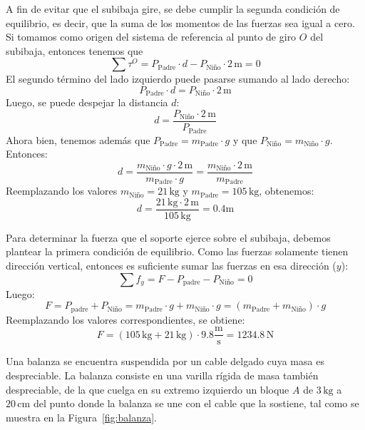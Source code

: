 \documentclass[addpoints]{exam}
\begin{document}
\begin{questions}
    \begin{solution}
    A fin de evitar que el subibaja gire, se debe cumplir la segunda condición de equilibrio, es decir, que la suma de los momentos de las fuerzas sea igual a cero. Si tomamos como origen del sistema de referencia al punto de giro \( O \) del subibaja, entonces tenemos que $$ \sum \tau^{O} = P_\text{Padre} \cdot d - P_\text{Niño} \cdot 2 \, \text{m} = 0 $$ El segundo término del lado izquierdo puede pasarse sumando al lado derecho: $$ P_\text{Padre} \cdot d = P_\text{Niño} \cdot 2 \, \text{m} $$ Luego, se puede despejar la distancia \( d \): $$ d = \frac{P_\text{Niño} \cdot 2 \, \text{m}}{P_\text{Padre}}$$ Ahora bien, tenemos además que \( P_\text{Padre} = m_\text{Padre} \cdot g \) y que \( P_\text{Niño} = m_\text{Niño} \cdot g \). Entonces: $$d = \frac{m_\text{Niño} \cdot g \cdot 2 \, \text{m}}{m_\text{Padre} \cdot g} = \frac{m_\text{Niño} \cdot 2 \, \text{m}}{m_\text{Padre}} $$ Reemplazando los valores \( m_\text{Niño} = 21 \, \text{kg} \) y \( m_\text{Padre} = 105 \, \text{kg} \), obtenemos: $$d = \frac{21 \, \text{kg} \cdot 2 \, \text{m}}{105 \, \text{kg}} = 0.4 \text{m} $$

    Para determinar la fuerza que el soporte ejerce sobre el subibaja, debemos plantear la primera condición de equilibrio. Como las fuerzas solamente tienen dirección vertical, entonces es suficiente sumar las fuerzas en esa dirección (\( y \)): $$ \sum f_y = F - P_\text{padre} - P_\text{Niño} = 0$$ Luego: $$F = P_\text{padre} + P_\text{Niño} = m_\text{Padre} \cdot g + m_\text{Niño} \cdot g  = \left(m_\text{Padre} + m_\text{Niño}\right) \cdot g $$ Reemplazando los valores correspondientes, se obtiene: $$F = \left( 105 \, \text{kg} + 21 \, \text{kg}\right) \cdot 9.8 \frac{\text{m}}{\text{s}} = 1234.8 \, \text{N} $$
    \end{solution}

    \question Una balanza se encuentra suspendida por un cable delgado cuya masa es despreciable. La balanza consiste en una varilla rígida de masa también despreciable, de la que cuelga en su extremo izquierdo un bloque \( A \) de \( 3 \, \text{kg} \) a  \( 20 \, \text{cm} \) del punto donde la balanza se une con el cable que la sostiene, tal como se muestra en la Figura~\ref{fig:balanza}. 

\end{questions}
\end{document}
